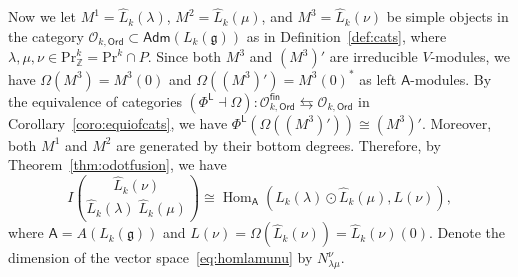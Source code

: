 \documentclass[12pt,a4paper,reqno]{amsart}
\numberwithin{equation}{section}
\theoremstyle{definition}
\newcommand{\g}{\mathfrak{g}}
\newcommand{\Hom}{\operatorname{Hom}}
\newcommand{\Z}{\mathbb{Z}}
\newcommand{\fusion}[3]{{\binom{#3}{#1\;#2}}}
\def\O{\mathcal{O}}
\def\Ord{\mathsf{Ord}}
\def\Adm{\mathsf{Adm}}
\def\fin{\mathsf{fin}}
\def\L{\mathsf{L}}
\def\Om{\Omega}
\def\Pr{\mathrm{Pr}}
\def\la{\lambda}
\def\A{\mathsf{A}}
\begin{document}
Now we let $M^1=\hat{L}_k(\la)$, $M^2=\hat{L}_k(\mu)$, and $M^3=\hat{L}_k(\nu)$ be simple objects in the category $\O_{k,\Ord}\subset \Adm(L_k(\g))$ as in Definition~\ref{def:cats}, where $\la,\mu,\nu\in \Pr^k_\Z=\Pr^k\cap P$. Since both $M^3$ and $(M^3)'$ are irreducible $V$-modules, we have $\Om(M^3)=M^3(0)$ and $\Om((M^3)')=M^3(0)^\ast$ as left $\A$-modules. By the equivalence of categories  $(\Phi^\L\dashv \Om):\O_{k,\Ord}^\fin\leftrightarrows \O_{k,\Ord}$ in Corollary~\ref{coro:equiofcats}, we have $\Phi^\L(\Om((M^3)'))\cong (M^3)'$. Moreover, both $M^1$ and $M^2$ are generated by their bottom degrees. Therefore, by Theorem~\ref{thm:odotfusion}, we have
\begin{equation}\label{eq:homlamunu}
I\fusion{\hat{L}_k(\la)}{\hat{L}_k(\mu)}{\hat{L}_k(\nu)}\cong \Hom_\A(\hat{L}_k(\la)\odot \hat{L}_k(\mu), L(\nu)),
\end{equation}
where $\A=A(L_k(\g))$ and $L(\nu)=\Om(\hat{L}_k(\nu))=\hat{L}_k(\nu)(0)$. Denote the dimension of the vector space~\eqref{eq:homlamunu} by $N_{\la\mu}^\nu$.
\end{document}

